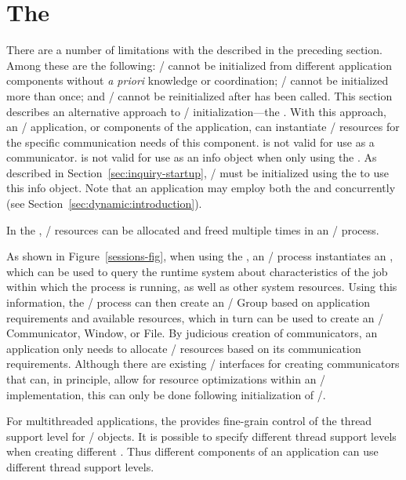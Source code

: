 \section{The \texorpdfstring{\spm}{Sessions Model}}
\label{sec:model_sessions}

There are a number of limitations with the \wpm{} described
in the preceding section.  Among these are the following:
\MPI/ cannot be initialized
from different application components without \emph{a priori} knowledge or coordination;
\MPI/ cannot be initialized more than once; and \MPI/ cannot be reinitialized after  has been called.
This section describes an alternative approach to \MPI/ initialization---the \spm{}.
With this approach, an \MPI/ application, or components of the application, can instantiate \MPI/ resources
for the specific communication needs of this component.   is not valid for use as a communicator.
 is not valid for use as an info object when only using the \spm{}.
As described in Section~\ref{sec:inquiry-startup}, \MPI/ must be initialized using the \wpm{} to use this info object.
Note that an application may employ both the \spm{} and \wpm{} concurrently (see Section~\ref{sec:dynamic:introduction}).
%
%

In the \spm{}, \MPI/ resources can be allocated and freed multiple times in an \MPI/ process.

As shown in Figure~\ref{sessions-fig}, when using the \spm{},
an \MPI/ process instantiates an , which can be used
to query the runtime system about characteristics of the job within which the process is running, as well
as other system resources. Using this information, the \MPI/ process can then create an \MPI/ Group based on
application requirements and available resources, which in turn can be used to create an \MPI/ Communicator, Window, or File.
By judicious creation of communicators, an application only needs to allocate \MPI/ resources based on its
communication requirements.  Although there are existing \MPI/ interfaces for creating communicators that can,
in principle, allow for resource optimizations within an \MPI/ implementation, this can only be done following
initialization of \MPI/.

For multithreaded applications, the \spm{} provides fine-grain control of the thread support level for \MPI/ objects.  It is possible to specify different thread support levels
when creating different
.
Thus different components of an application can use different thread support levels.

